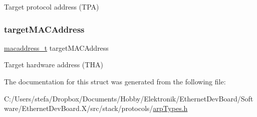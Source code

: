 Target protocol address (T\+PA) 

\mbox{\label{struct_a_r_p__message_a07b2e71c5ec73e1d4828fd350bd4f041}} 
\subsubsection{\texorpdfstring{targetMACAddress}{targetMACAddress}}
{\footnotesize\ttfamily \mbox{\hyperlink{group__ethernet_gacb865bcbf50a6c8cef05581bfabff373}{macaddress\+\_\+t}} target\+M\+A\+C\+Address}



Target hardware address (T\+HA) 



The documentation for this struct was generated from the following file\+:\begin{DoxyCompactItemize}
\item 
C\+:/\+Users/stefa/\+Dropbox/\+Documents/\+Hobby/\+Elektronik/\+Ethernet\+Dev\+Board/\+Software/\+Ethernet\+Dev\+Board.\+X/src/stack/protocols/\mbox{\hyperlink{arp_types_8h}{arp\+Types.\+h}}\end{DoxyCompactItemize}
